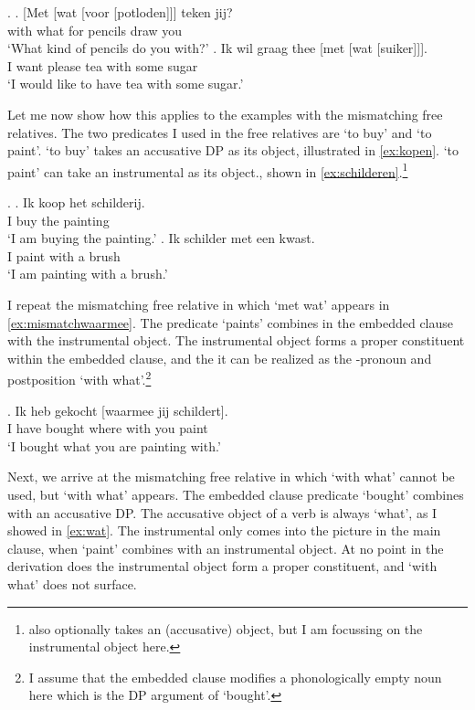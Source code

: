 \documentclass[12pt]{article}
\begin{document}
\ex.\label{ex:moremetwat}
\ag. [Met [wat [voor [potloden]]] teken jij?\\
 with what for pencils draw you\\
 `What kind of pencils do you with?'\label{ex:watwasfur}
\bg. Ik wil graag thee [met [wat [suiker]]].\\
 I want please tea with some sugar\\
 `I would like to have tea with some sugar.'\label{ex:watindef}

Let me now show how this applies to the examples with the mismatching free relatives. The two predicates I used in the free relatives are  `to buy' and   `to paint'.  `to buy' takes an accusative DP as its object, illustrated in \ref{ex:kopen}.  `to paint' can take an instrumental as its object., shown in \ref{ex:schilderen}.\footnote{ also optionally takes an (accusative) object, but I am focussing on the instrumental object here.}

\ex.
\ag. Ik koop het schilderij.\\
 I buy the painting\\
 `I am buying the painting.'\label{ex:kopen}
\bg. Ik schilder met een kwast.\\
 I paint with a brush\\
 `I am painting with a brush.'\label{ex:schilderen}

I repeat the mismatching free relative in which  `met wat' appears in \ref{ex:mismatchwaarmee}. The predicate  `paints' combines in the embedded clause with the instrumental object. The instrumental object forms a proper constituent within the embedded clause, and the it can be realized as the -pronoun and postposition  `with what'.\footnote{I assume that the embedded clause modifies a phonologically empty noun here which is the DP argument of  `bought'.}

\exg. Ik heb gekocht [waarmee jij schildert].\\
 I have bought {where with} you paint\\
 `I bought what you are painting with.'\label{ex:mismatchwaarmee}

Next, we arrive at the mismatching free relative in which  `with what' cannot be used, but  `with what' appears. The embedded clause predicate  `bought' combines with an accusative DP. The accusative object of a verb is always  `what', as I showed in \ref{ex:wat}. The instrumental only comes into the picture in the main clause, when  `paint' combines with an instrumental object. At no point in the derivation does the instrumental object form a proper constituent, and  `with what' does not surface.
\end{document}
